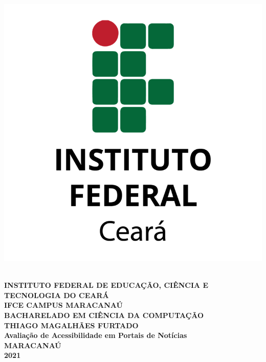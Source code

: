 \documentclass[a4paper]{article}
\begin{document}
\thispagestyle{empty}

\begin{titlepage}
	\vfill
	\begin{center}
		\parbox{6cm}{\includegraphics[scale=0.2]{logo.png}}\\
		\begingroup
		\fontsize{12pt}{0pt}\selectfont
		{\large \textbf{INSTITUTO FEDERAL DE EDUCAÇÃO, CIÊNCIA E TECNOLOGIA DO CEARÁ}}\\[0.2cm]
		\fontsize{12pt}{0pt}\selectfont
		{\large \textbf{IFCE CAMPUS MARACANAÚ}}\\[0.2cm]
		\fontsize{12pt}{0pt}\selectfont	
		{\large \textbf{BACHARELADO EM CIÊNCIA DA COMPUTAÇÃO}}\\[4cm]
		\fontsize{12pt}{0pt}\selectfont
		{\large \textbf{THIAGO MAGALHÃES FURTADO}}\\[3.5cm]
		\fontsize{12pt}{0pt}\selectfont
		{\large \textbf{Avaliação de Acessibilidade em Portais de Notícias}}\\[3.5cm]
		\fontsize{12pt}{0pt}\selectfont
		{\large \textbf{MARACANAÚ}}\\[0.2cm]
		\fontsize{12pt}{0pt}\selectfont
		{\large \textbf{2021}}
		\endgroup
	\end{center}
\end{titlepage}
\end{document}
